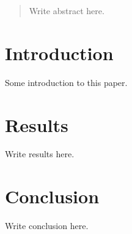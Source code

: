 \documentclass{article}
\begin{document}
\begin{abstract}
Write abstract here.
\end{abstract}

\section{Introduction}

Some introduction to this paper.

\section{Results}

Write results here.

\section{Conclusion}

Write conclusion here.
\end{document}
